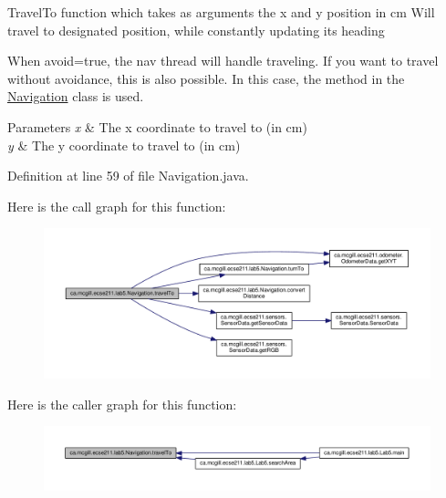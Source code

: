 Travel\+To function which takes as arguments the x and y position in cm Will travel to designated position, while constantly updating it\textquotesingle{}s heading

When avoid=true, the nav thread will handle traveling. If you want to travel without avoidance, this is also possible. In this case, the method in the \hyperlink{classca_1_1mcgill_1_1ecse211_1_1lab5_1_1_navigation}{Navigation} class is used.


\begin{DoxyParams}{Parameters}
{\em x} & The x coordinate to travel to (in cm) \\
\hline
{\em y} & The y coordinate to travel to (in cm) \\
\hline
\end{DoxyParams}


Definition at line 59 of file Navigation.\+java.

Here is the call graph for this function\+:
\nopagebreak
\begin{figure}[H]
\begin{center}
\leavevmode
\includegraphics[width=350pt]{classca_1_1mcgill_1_1ecse211_1_1lab5_1_1_navigation_a0f3288c38c7c28b495ae4d7e95d85f78_cgraph}
\end{center}
\end{figure}
Here is the caller graph for this function\+:
\nopagebreak
\begin{figure}[H]
\begin{center}
\leavevmode
\includegraphics[width=350pt]{classca_1_1mcgill_1_1ecse211_1_1lab5_1_1_navigation_a0f3288c38c7c28b495ae4d7e95d85f78_icgraph}
\end{center}
\end{figure}
\mbox{\label{classca_1_1mcgill_1_1ecse211_1_1lab5_1_1_navigation_a2b39928c8062fe6863de8e818d009e91}} 
